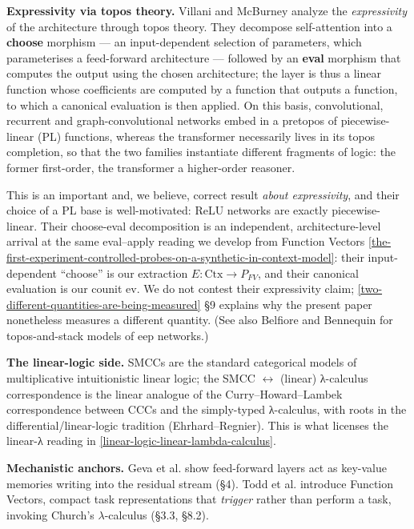 \documentclass[a4paper,11pt]{article}
\begin{document}
\textbf{Expressivity via topos theory.} Villani and McBurney \cite{Topos} analyze the \emph{expressivity} of the architecture through topos
theory. They decompose self-attention into a \textbf{choose} morphism --- an input-dependent selection of parameters, which parameterises a
feed-forward architecture --- followed by an \textbf{eval} morphism that computes the output using the chosen architecture; the layer is thus a
linear function whose coefficients are computed by a function that
outputs a function, to which a canonical evaluation is then applied. On
this basis, convolutional, recurrent and graph-convolutional networks
embed in a pretopos of piecewise-linear (PL) functions, whereas the
transformer necessarily lives in its topos completion, so that the two
families instantiate different fragments of logic: the former first-order, the transformer a higher-order reasoner.

This is an important and, we believe, correct result \emph{about expressivity}, and their choice of a PL base is well-motivated: ReLU
networks are exactly piecewise-linear. Their choose-eval decomposition is an independent, architecture-level arrival at the same eval--apply reading we develop from Function Vectors\cite{FV} \ref{the-first-experiment-controlled-probes-on-a-synthetic-in-context-model}: their input-dependent ``choose'' is our extraction \(E:\mathrm{Ctx}\to P_{FV}\), and their canonical evaluation is our counit \(\mathrm{ev}\). We do not contest their expressivity claim; \ref{two-different-quantities-are-being-measured} §9
explains why the present paper nonetheless measures a different quantity. (See also Belfiore and Bennequin \cite{Belfiore} for topos-and-stack models of eep networks.)

\textbf{The linear-logic side.} SMCCs are the standard categorical models of multiplicative intuitionistic linear logic; the SMCC $\leftrightarrow$ (linear) λ-calculus correspondence is the linear analogue of the Curry--Howard--Lambek correspondence between CCCs and the simply-typed λ-calculus, with roots in the differential/linear-logic tradition (Ehrhard--Regnier). This is what licenses the linear-λ reading in \ref{linear-logic-linear-lambda-calculus}.

\textbf{Mechanistic anchors.} Geva et al. \cite{Geva} show feed-forward layers act as key-value memories writing into the residual
stream (§4). Todd et al.\cite{Todd} introduce Function Vectors, compact task representations that \emph{trigger} rather than perform a task, invoking Church's $\lambda$-calculus (§3.3, §8.2).
\end{document}

